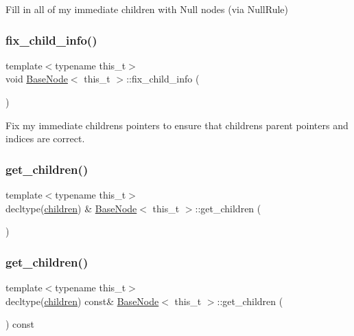 Fill in all of my immediate children with Null nodes (via Null\+Rule)\mbox{\label{class_base_node_ad0ef64be7c40f1e9f9170d8d51f8d3bf}} 
\subsubsection{\texorpdfstring{fix\+\_\+child\+\_\+info()}{fix\_child\_info()}}
{\footnotesize\ttfamily template$<$typename this\+\_\+t$>$ \\
void \hyperlink{class_base_node}{Base\+Node}$<$ this\+\_\+t $>$\+::fix\+\_\+child\+\_\+info (\begin{DoxyParamCaption}{ }\end{DoxyParamCaption})\hspace{0.3cm}{\ttfamily [inline]}}

Fix my immediate children\textquotesingle{}s pointers to ensure that children\textquotesingle{}s parent pointers and indices are correct.\mbox{\label{class_base_node_a7177763ffa8b3e658124c586dde30be9}} 
\subsubsection{\texorpdfstring{get\+\_\+children()}{get\_children()}\hspace{0.1cm}{\footnotesize\ttfamily [1/2]}}
{\footnotesize\ttfamily template$<$typename this\+\_\+t$>$ \\
decltype(\hyperlink{class_base_node_af2f245862083d173c950fca048c03546}{children}) \& \hyperlink{class_base_node}{Base\+Node}$<$ this\+\_\+t $>$\+::get\+\_\+children (\begin{DoxyParamCaption}{ }\end{DoxyParamCaption})\hspace{0.3cm}{\ttfamily [inline]}}

\mbox{\label{class_base_node_aec98c1640e03a27d1663f876bc49ef69}} 
\subsubsection{\texorpdfstring{get\+\_\+children()}{get\_children()}\hspace{0.1cm}{\footnotesize\ttfamily [2/2]}}
{\footnotesize\ttfamily template$<$typename this\+\_\+t$>$ \\
decltype(\hyperlink{class_base_node_af2f245862083d173c950fca048c03546}{children}) const\& \hyperlink{class_base_node}{Base\+Node}$<$ this\+\_\+t $>$\+::get\+\_\+children (\begin{DoxyParamCaption}{ }\end{DoxyParamCaption}) const\hspace{0.3cm}{\ttfamily [inline]}}


